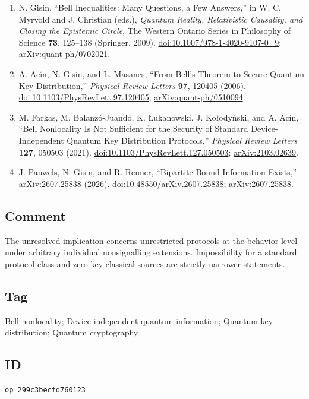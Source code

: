 \begin{enumerate}[label={},leftmargin=4.8em,labelsep=0.5em]
  \footnotesize
  \item[\textup{[Gis09]}]\label{ref:p30-gisin}
  N. Gisin, ``Bell Inequalities: Many Questions, a Few Answers,'' in
  W. C. Myrvold and J. Christian (eds.), \emph{Quantum Reality, Relativistic
  Causality, and Closing the Epistemic Circle}, The Western Ontario Series in
  Philosophy of Science \textbf{73}, 125--138 (Springer, 2009).
  \href{https://doi.org/10.1007/978-1-4020-9107-0_9}{doi:10.1007/978-1-4020-9107-0\_9};
  \href{https://arxiv.org/abs/quant-ph/0702021}{arXiv:quant-ph/0702021}.

  \item[\textup{[AGM06]}]\label{ref:p30-acin}
  A. Ac\'in, N. Gisin, and L. Masanes, ``From Bell's Theorem to Secure Quantum
  Key Distribution,'' \emph{Physical Review Letters} \textbf{97}, 120405
  (2006). \href{https://doi.org/10.1103/PhysRevLett.97.120405}{doi:10.1103/PhysRevLett.97.120405};
  \href{https://arxiv.org/abs/quant-ph/0510094}{arXiv:quant-ph/0510094}.

  \item[\textup{[FBJLA21]}]\label{ref:p30-farkas}
  M. Farkas, M. Balanz\'o-Juand\'o, K. \L{}ukanowski, J. Ko{\l}ody\'nski, and
  A. Ac\'in, ``Bell Nonlocality Is Not Sufficient for the Security of Standard
  Device-Independent Quantum Key Distribution Protocols,'' \emph{Physical
  Review Letters} \textbf{127}, 050503 (2021).
  \href{https://doi.org/10.1103/PhysRevLett.127.050503}{doi:10.1103/PhysRevLett.127.050503};
  \href{https://arxiv.org/abs/2103.02639}{arXiv:2103.02639}.

  \item[\textup{[PGR26]}]\label{ref:p30-pauwels}
  J. Pauwels, N. Gisin, and R. Renner, ``Bipartite Bound Information Exists,''
  arXiv:2607.25838 (2026).\newline
  \href{https://doi.org/10.48550/arXiv.2607.25838}{doi:10.48550/arXiv.2607.25838};
  \href{https://arxiv.org/abs/2607.25838}{arXiv:2607.25838}.
\end{enumerate}

\subsection*{Comment}

The unresolved implication concerns unrestricted protocols at the behavior
level under arbitrary individual nonsignalling extensions.  Impossibility
for a standard protocol class and zero-key classical sources are strictly
narrower statements.

\subsection*{Tag}

Bell nonlocality; Device-independent quantum information; Quantum key
distribution; Quantum cryptography

\subsection*{ID}

\texttt{op\_299c3becfd760123}
